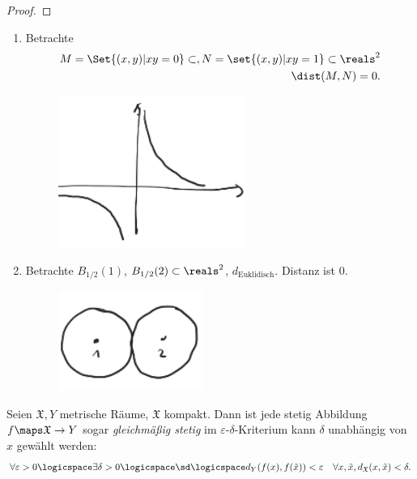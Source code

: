 \begin{beispiel*}
\begin{proof}
    \end{proof}
    \begin{achtung}
        \begin{enumerate}
            \item Betrachte
            \begin{align*}
                M=\Set{(x,y)|xy=0}\subset , N=\set{(x,y)|xy=1}\subset \reals^2\\
                \dist(M,N)=0.
            \end{align*}
            \begin{figure}[H]
                \centering
                \includegraphics[width=0.3\linewidth]{figures/achsen_und_eins_durch_x}
                \caption*{}
                \label{fig:achsen_und_eins_durch_x}
            \end{figure}
            
            \item Betrachte \( B_{1/2}(1) \), \( B_{1/2}(2)\subset \reals^2 \), \( d_{\text{Euklidisch}} \). Distanz ist \( 0 \).
            \begin{figure}[H]
                \centering
                \includegraphics[width=0.3\linewidth]{figures/beruehrende_kreise}
                \label{fig:beruehrende_kreise}
            \end{figure}
            
        \end{enumerate}
    \end{achtung}    
\end{beispiel*}
\begin{satzdef}
    Seien \( \mathfrak{X},Y \) metrische Räume, \( \mathfrak{X} \) kompakt. Dann ist jede stetig Abbildung \( f\maps \mathfrak{X}\to Y \) sogar \emph{gleichmäßig stetig} \dh im \( \varepsilon \)-\( \delta \)-Kriterium kann \( \delta \) unabhängig von \( x \) gewählt werden:
    \begin{align*}
        \forall \varepsilon>0\logicspace \exists \delta>0\logicspace \sd\logicspace d_Y(f(x),f(\tilde{x}))<\varepsilon\quad \forall x,\tilde{x},d_{\mathfrak{X}}(x,\tilde{x})<\delta.
    \end{align*}
\end{satzdef}
